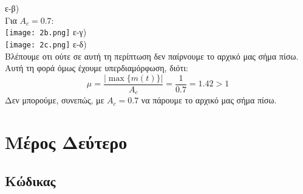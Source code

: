 \documentclass{article}
\begin{document}
ε-β)\\
Για $A_c=0.7$:\\
\texttt{[image: 2b.png]}
ε-γ)\\
\texttt{[image: 2c.png]}
ε-δ)\\
Βλέπουμε οτι ούτε σε αυτή τη περίπτωση δεν παίρνουμε το αρχικό μας σήμα πίσω. Αυτή τη φορά όμως έχουμε υπερδιαμόρφωση, διότι:
\[\mu=\frac{|\max\{m(t)\}|}{A_c}=\frac{1}{0.7}=1.42>1 \]
Δεν μπορούμε, συνεπώς, με $A_c=0.7$ να πάρουμε το αρχικό μας σήμα πίσω.
















\section{Μέρος Δεύτερο}

\subsection{Κώδικας }
\end{document}
